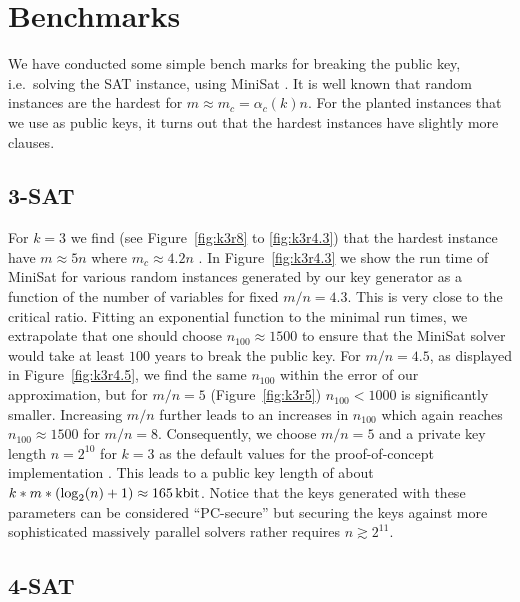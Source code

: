 \documentclass[final,journal,compsoc]{IEEEtran}
\begin{document}
\section{Benchmarks\label{sec:benchmarks}}

We have conducted some simple bench marks for breaking the public key,
i.e.\ solving the SAT instance, using
MiniSat \cite{minisat}.  It is well known that
random instances are the hardest for $m\approx m_c = \alpha_c(k) n$. For the planted
instances that we use as public keys, it turns out that the hardest
instances have slightly more clauses. 



\subsection{3-SAT}

For $k=3$ we find (see Figure~\ref{fig:k3r8} to \ref{fig:k3r4.3})
that the hardest instance have $m \approx 5 n$ where $m_c \approx 4.2
n$ \cite{Kirkpatrick1994}.  In Figure~\ref{fig:k3r4.3} we show the
run time of MiniSat for various random instances generated by our key
generator as a function of the number of variables for fixed
$m/n=4.3$. This is very close to the critical ratio. Fitting an
exponential function to the minimal run times, we extrapolate that one
should choose $n_{100}\approx 1500$ to ensure that the MiniSat solver
would take at least $100$ years to break the public key. For $m/n=4.5$,
as displayed in Figure~\ref{fig:k3r4.5}, we find the same $n_{100}$
within the error of our approximation, but for $m/n=5$
(Figure~\ref{fig:k3r5}) $n_{100} < 1000$ is significantly
smaller.  Increasing $m/n$ further leads to an increases in $n_{100}$ which
again reaches $n_{100}\approx 1500$ for $m/n=8$.
Consequently, we choose $m/n=5$ and a private key length
$n=2^{10}$ for $k=3$ as the default values for the 
 proof-of-concept implementation \cite{code}. 
This leads to a public key length of about $k * m
*(\log_2(n)+1) \approx \SI{165}{\kilo\bit}$. Notice that the keys
generated with these parameters can be considered ``PC-secure'' but
securing the keys against more sophisticated massively parallel
solvers rather requires $n \gtrsim 2^{11}$.





\subsection{4-SAT}
\end{document}
